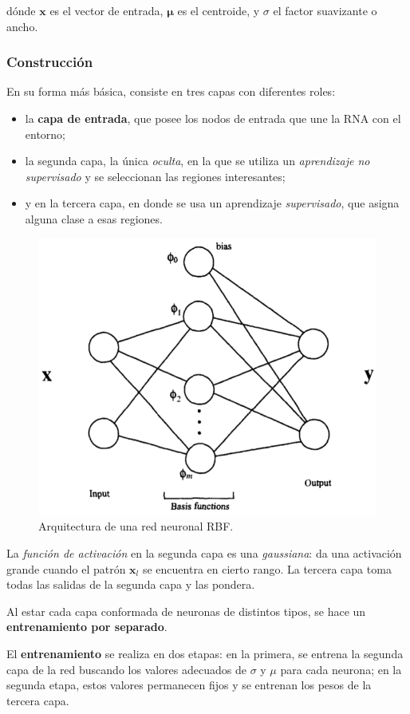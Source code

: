 \documentclass[10pt,a4paper]{article}
\begin{document}
dónde $\mathbf{x}$ es el vector de entrada, $\mathbf{\mu}$ es el centroide, y $\sigma$ el factor suavizante o ancho.

\subsubsection{Construcción}

En su forma más básica, consiste en tres capas con diferentes roles:
\begin{itemize}
\item la \textbf{capa de entrada}, que posee los nodos de entrada que une la RNA con el entorno;
\item la segunda capa, la única \textit{oculta}, en la que se utiliza un \textit{aprendizaje no supervisado} y se seleccionan las regiones interesantes;
\item y en la tercera capa, en donde se usa un aprendizaje \textit{supervisado}, que asigna alguna clase a esas regiones.
\end{itemize}

\begin{figure}
  \label{fig:radial}
  \caption{Arquitectura de una red neuronal RBF.}
  \centering
  \hbox{\includegraphics[width=0.5\textwidth-\fboxrule-\fboxrule]{imgs/radial.png}}  
\end{figure}	

La \textit{función de activación} en la segunda capa es una \textit{gaussiana}: da una activación grande cuando el patrón $\mathbf{x}_l$ se encuentra en cierto rango. La tercera capa toma todas las salidas de la segunda capa y las pondera.

Al estar cada capa conformada de neuronas de distintos tipos, se hace un \textbf{entrenamiento por separado}.

El \textbf{entrenamiento} se realiza en dos etapas: en la primera, se entrena la segunda capa de la red buscando los valores adecuados de $\sigma$ y $\mu$ para cada neurona; en la segunda etapa, estos valores permanecen fijos y se entrenan los pesos de la tercera capa.
\end{document}
